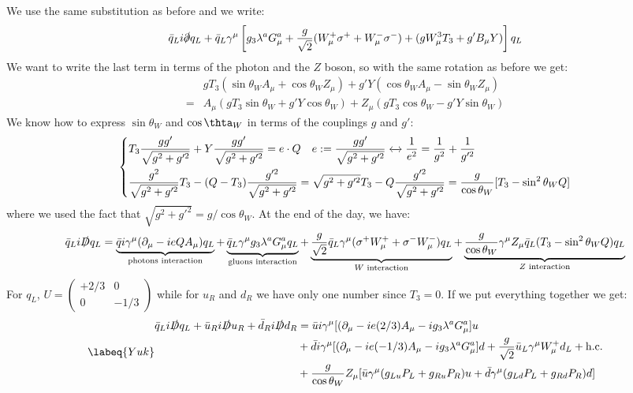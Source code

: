 \documentclass[../main.tex]{subfiles}
\begin{document}
We use the same substitution as before and we write:
\[
\Bar{q}_Li\slashed{\partial}q_L+\Bar{q}_L\gamma^\mu\left[g_3\lambda^aG_\mu^a+\frac{g}{\sqrt{2}}(W_\mu^+\sigma^++W_\mu^-\sigma^-)+(gW_\mu^3T_3+g'B_\mu Y)\right]q_L
\]
We want to write the last term in terms of the photon and the $Z$ boson, so with the same rotation as before we get:
\begin{align*}
&gT_3(\sin\theta_WA_\mu+\cos\theta_WZ_\mu)+g'Y(\cos\theta_WA_\mu-\sin\theta_WZ_\mu)\\
=&A_\mu(gT_3\sin\theta_W+g'Y\cos\theta_W)+Z_\mu(gT_3\cos\theta_W-g'Y\sin\theta_W)
\end{align*}
We know how to express $\sin\theta_W$ and $\cos\thta_W$ in terms of the couplings $g$ and $g'$:
\[
\left\{
\begin{aligned}
&T_3\frac{gg'}{\sqrt{g^2+g'^2}}+Y\frac{gg'}{\sqrt{g^2+g'^2}}=e\cdot Q \quad e:=\frac{gg'}{\sqrt{g^2+g'^2}}\xleftrightarrow[]{}\frac{1}{e^2}=\frac{1}{g^2}+\frac{1}{g'^2}\\
&\frac{g^2}{\sqrt{g^2+g'^2}}T_3-(Q-T_3)\frac{g'^2}{\sqrt{g^2+g'^2}}=\sqrt{g^2+g'^2}T_3-Q\frac{g'^2}{\sqrt{g^2+g'^2}}=\frac{g}{\cos\theta_W}[T_3-\sin^2\theta_WQ]
\end{aligned}
\right.
\]
where we used the fact that $\sqrt{g^2+g'^2}=g/\cos\theta_W$. At the end of the day, we have:
\[
\Bar{q}_Li\slashed{D}q_L=\underbrace{\Bar{q}i\gamma^\mu(\partial_\mu-ieQA_\mu)q_L}_{\text{photons interaction}}+\underbrace{\Bar{q}_L\gamma^\mu g_3\lambda^aG_\mu^aq_L}_{\text{gluons interaction}}+\underbrace{\frac{g}{\sqrt{2}}\Bar{q}_L\gamma^\mu(\sigma^+W_\mu^++\sigma^-W_\mu^-)q_L}_{\text{$W$ interaction}}+\underbrace{\frac{g}{\cos\theta_W}\gamma^\mu Z_\mu\Bar{q}_L(T_3-\sin^2\theta_WQ)q_L}_{\text{$Z$ interaction}}
\]
For $q_L$, $U=\begin{pmatrix}
    +2/3 & 0\\0 & -1/3
\end{pmatrix}$ while for $u_R$ and $d_R$ we have only one number since $T_3=0$. If we put everything together we get:
\begin{equation}
\labeq{Yuk}
\begin{aligned}
\Bar{q}_Li\slashed{D}q_L+\Bar{u}_Ri\slashed{D}u_R+\Bar{d}_Ri\slashed{D}d_R&=\Bar{u}i\gamma^\mu[(\partial_\mu-ie(2/3)A_\mu-ig_3\lambda^aG_\mu^a]u\\
&+\Bar{d}i\gamma^\mu[(\partial_\mu-ie(-1/3)A_\mu-ig_3\lambda^aG_\mu^a]d+\frac{g}{\sqrt{2}}\Bar{u}_L\gamma^\mu W_\mu^+d_L+\text{h.c.}\\
&+\frac{g}{\cos\theta_W}Z_\mu[\Bar{u}\gamma^\mu(g_{Lu}P_L+g_{Ru}P_R)u+\Bar{d}\gamma^\mu(g_{Ld}P_L+g_{Rd}P_R)d]
\end{aligned}
\end{equation}
\end{document}
